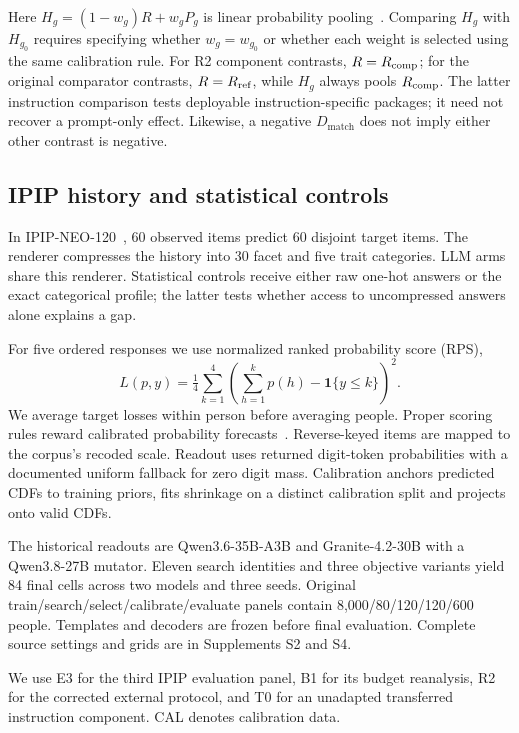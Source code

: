 \documentclass[11pt]{article}
\begin{document}
Here $H_g=(1-w_g)R+w_gP_g$ is linear probability pooling~\citep{gneiting2011combining}. Comparing $H_g$ with $H_{g_0}$ requires specifying whether $w_g=w_{g_0}$ or whether each weight is selected using the same calibration rule. For R2 component contrasts, $R=R_{\rm comp}$; for the original comparator contrasts, $R=R_{\rm ref}$, while $H_g$ always pools $R_{\rm comp}$. The latter instruction comparison tests deployable instruction-specific packages; it need not recover a prompt-only effect. Likewise, a negative $D_{\mathrm{match}}$ does not imply either other contrast is negative.

\subsection{IPIP history and statistical controls}
In IPIP-NEO-120~\citep{johnson2014ipip}, 60 observed items predict 60 disjoint target items. The renderer compresses the history into 30 facet and five trait categories. LLM arms share this renderer. Statistical controls receive either raw one-hot answers or the exact categorical profile; the latter tests whether access to uncompressed answers alone explains a gap.

For five ordered responses we use normalized ranked probability score (RPS),
\begin{equation}
L(p,y)=\tfrac14\sum_{k=1}^4\left(\sum_{h=1}^kp(h)-\mathbf1\{y\le k\}\right)^2.
\end{equation}
We average target losses within person before averaging people. Proper scoring rules reward calibrated probability forecasts~\citep{gneiting2007proper}. Reverse-keyed items are mapped to the corpus's recoded scale. Readout uses returned digit-token probabilities with a documented uniform fallback for zero digit mass. Calibration anchors predicted CDFs to training priors, fits shrinkage on a distinct calibration split and projects onto valid CDFs.

The historical readouts are Qwen3.6-35B-A3B and Granite-4.2-30B with a Qwen3.8-27B mutator. Eleven search identities and three objective variants yield 84 final cells across two models and three seeds. Original train/search/select/calibrate/evaluate panels contain 8,000/80/120/120/600 people. Templates and decoders are frozen before final evaluation. Complete source settings and grids are in Supplements S2 and S4.

We use E3 for the third IPIP evaluation panel, B1 for its budget reanalysis, R2 for the corrected external protocol, and T0 for an unadapted transferred instruction component. CAL denotes calibration data.
\end{document}
